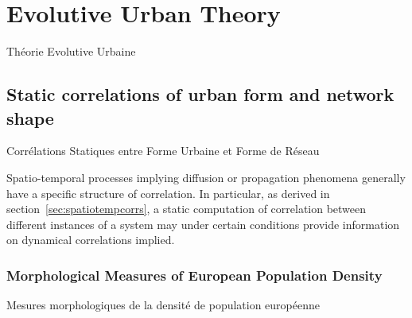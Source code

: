 



\chapter{Evolutive Urban Theory}{Théorie Evolutive Urbaine} %

\label{ch:evolutive} %



\headercit{}{}{}


\bigskip




















\newpage

\section{Static correlations of urban form and network shape}{Corrélations Statiques entre Forme Urbaine et Forme de Réseau}



Spatio-temporal processes implying diffusion or propagation phenomena generally have a specific structure of correlation. In particular, as derived in section~\ref{sec:spatiotempcorrs}, a static computation of correlation between different instances of a system may under certain conditions provide information on dynamical correlations implied.




\subsection{Morphological Measures of European Population Density}{Mesures morphologiques de la densité de population européenne}

